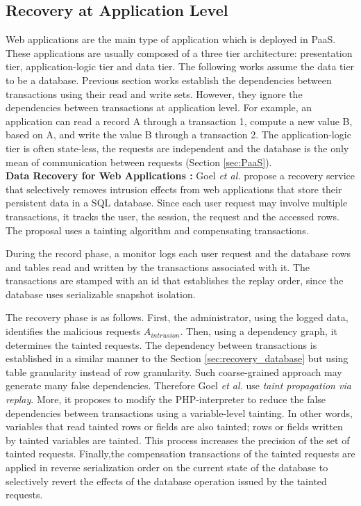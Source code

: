\subsection{Recovery at Application Level}
\label{sec:recApp}
Web applications are the main type of application which is deployed in PaaS. These applications are usually composed of a three tier architecture: presentation tier, application-logic tier and data tier. The following works assume the data tier to be a database. 
Previous section works establish the dependencies between transactions using their read and write sets. However, they ignore the dependencies between transactions at application level. For example, an application can read a record A through a transaction 1, compute a new value B, based on A, and write the value B through a transaction 2. The application-logic tier is often state-less, the requests are independent and the database is the only mean of communication between requests (Section \ref{sec:PaaS}).\\ 


\textbf{Data Recovery for Web Applications \cite{Akkus2010}:} Goel \textit{et al.} propose a recovery service that selectively removes intrusion effects from web applications that store their persistent data in a SQL database. Since each user request may involve multiple transactions, it tracks the user, the session, the request and the accessed rows. The proposal uses a tainting algorithm and compensating transactions.

During the record phase, a monitor logs each user request and the database rows and tables read and written by the transactions associated with it. The transactions are stamped with an id that establishes the replay order, since the database uses serializable snapshot isolation.

The recovery phase is as follows. First, the administrator, using the logged data, identifies the malicious requests $A_{intrusion}$. Then, using a dependency graph, it determines the tainted requests. The dependency between transactions is established in a similar manner to the Section \ref{sec:recovery_database} but using table granularity instead of row granularity. Such coarse-grained approach may generate many false dependencies. Therefore Goel \textit{et al.} use \textit{taint propagation via replay}. More, it proposes to modify the PHP-interpreter to reduce the false dependencies between transactions using a variable-level tainting. In other words, variables that read tainted rows or fields are also tainted; rows or fields written by tainted variables are tainted. This process increases the precision of the set of tainted requests. Finally,the compensation transactions of the tainted requests are applied in reverse serialization order on the current state of the database to selectively revert the effects of the database operation issued by the tainted requests.\\ 


